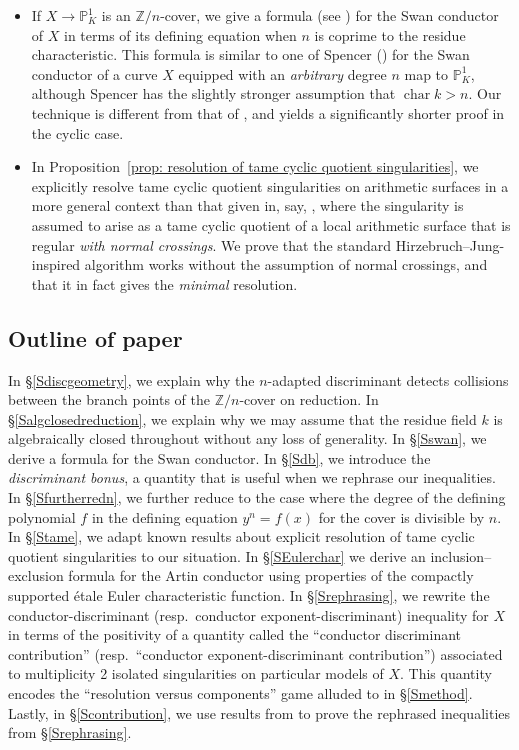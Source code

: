 \documentclass[12pt]{amsart}
\numberwithin{equation}{section}
\theoremstyle{definition}
\newcommand{\ints}{\mathbb Z}
\newcommand{\proj}{\mathbb P}
\DeclareMathOperator{\chara}{char}
\begin{document}
\begin{itemize}
  \item If $X \to \proj^1_K$ is an $\ints/n$-cover, we give a formula (see ) for the Swan
    conductor of $X$ in terms of its
    defining equation when $n$ is coprime to the residue
    characteristic.  This formula is similar to one of Spencer
    (\cite[Corollary~1.7, Remark~4.3]{Spencer}) for the Swan conductor
     of a curve $X$ equipped with an \emph{arbitrary} degree $n$ map
     to $\proj^1_K$, although Spencer has the slightly
    stronger assumption that $\chara k > n$. Our
    technique is different from that of \cite{Spencer}, and yields a
    significantly shorter proof in the cyclic case.
  \item In Proposition~\ref{prop: resolution of tame cyclic quotient
      singularities}, we explicitly resolve tame cyclic quotient singularities on
    arithmetic surfaces in a
    more general context than that given in, say, \cite{HN}, where the
    singularity is assumed to arise as a tame cyclic quotient of a local
    arithmetic surface that is regular
    \emph{with normal crossings}.  We prove that the standard
    Hirzebruch--Jung-inspired algorithm works without the assumption
    of normal crossings, and that it in fact gives the
    \emph{minimal} resolution. 
\end{itemize}



\subsection{Outline of paper}\label{Soutline}
In \S\ref{Sdiscgeometry}, we explain why the $n$-adapted discriminant detects collisions between the branch points of the $\ints/n$-cover on reduction. In \S\ref{Salgclosedreduction}, we explain why we may assume that the residue field $k$ is algebraically closed throughout without any loss of generality. In \S\ref{Sswan}, we
derive a formula for the Swan conductor. In \S\ref{Sdb}, we introduce the
\emph{discriminant bonus}, a quantity that is useful when we rephrase
our inequalities. In \S\ref{Sfurtherredn}, we further reduce to the case where the degree of the defining polynomial $f$ in the defining equation $y^n=f(x)$ for the cover is divisible by $n$. In \S\ref{Stame}, we adapt known results about explicit
resolution of tame cyclic quotient singularities to our situation. In \S\ref{SEulerchar} we derive an inclusion--exclusion formula for the Artin conductor using properties of the compactly supported \'{e}tale Euler characteristic function. In \S\ref{Srephrasing}, we
rewrite the conductor-discriminant (resp.\ conductor exponent-discriminant)
inequality for $X$ in terms of the positivity of a quantity called the
``conductor discriminant contribution'' (resp.\ ``conductor
exponent-discriminant contribution'') associated to multiplicity 2 isolated
singularities on particular models of $X$.  This quantity encodes the
``resolution versus components'' game alluded to in \S\ref{Smethod}.
Lastly, in
\S\ref{Scontribution}, we use results from \cite{Part2} to prove the
rephrased inequalities from \S\ref{Srephrasing}.
\end{document}
